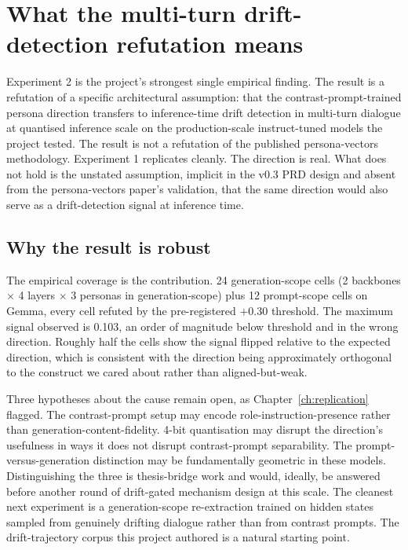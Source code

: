 \section{What the multi-turn drift-detection refutation means}

Experiment 2 is the project's strongest single empirical finding. The result is a refutation of a specific architectural assumption: that the contrast-prompt-trained persona direction transfers to inference-time drift detection in multi-turn dialogue at quantised inference scale on the production-scale instruct-tuned models the project tested. The result is not a refutation of the published persona-vectors methodology. Experiment 1 replicates cleanly. The direction is real. What does not hold is the unstated assumption, implicit in the v0.3 PRD design and absent from the persona-vectors paper's validation, that the same direction would also serve as a drift-detection signal at inference time.

\subsection{Why the result is robust}

The empirical coverage is the contribution. 24 generation-scope cells (2 backbones $\times$ 4 layers $\times$ 3 personas in generation-scope) plus 12 prompt-scope cells on Gemma, every cell refuted by the pre-registered $+0.30$ threshold. The maximum signal observed is 0.103, an order of magnitude below threshold and in the wrong direction. Roughly half the cells show the signal flipped relative to the expected direction, which is consistent with the direction being approximately orthogonal to the construct we cared about rather than aligned-but-weak.

Three hypotheses about the cause remain open, as Chapter~\ref{ch:replication} flagged. The contrast-prompt setup may encode role-instruction-presence rather than generation-content-fidelity. 4-bit quantisation may disrupt the direction's usefulness in ways it does not disrupt contrast-prompt separability. The prompt-versus-generation distinction may be fundamentally geometric in these models. Distinguishing the three is thesis-bridge work and would, ideally, be answered before another round of drift-gated mechanism design at this scale. The cleanest next experiment is a generation-scope re-extraction trained on hidden states sampled from genuinely drifting dialogue rather than from contrast prompts. The drift-trajectory corpus this project authored is a natural starting point.

